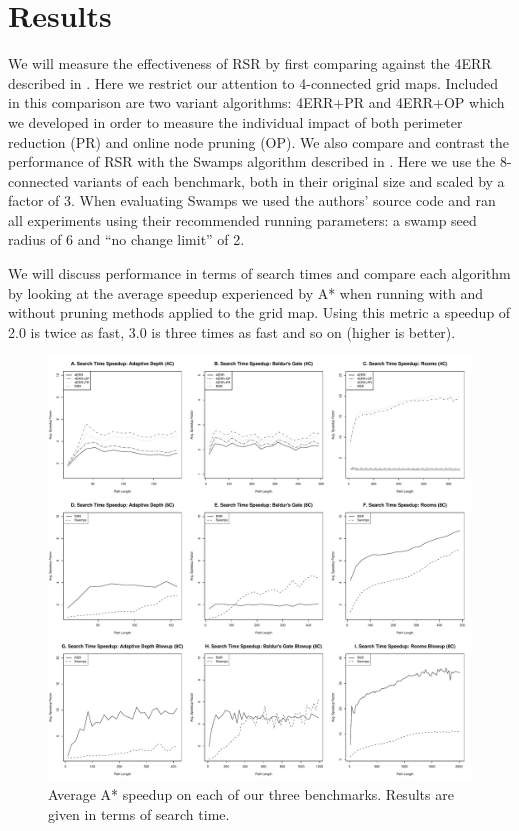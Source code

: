 \section{Results}
\label{sec-results}
We will measure the effectiveness of RSR by first comparing against the 4ERR
described in \cite{harabor10}. Here we restrict our attention to 4-connected
grid maps. Included in this comparison are two variant algorithms: 4ERR+PR and 
4ERR+OP which we developed in order to measure the individual impact of both
perimeter reduction (PR) and online node pruning (OP).
We also compare and contrast the performance of RSR
with the Swamps algorithm described in \cite{pochter10}.
Here we use the 8-connected variants of each benchmark, both in their original 
size and scaled by a factor of 3.
When evaluating Swamps we used the authors'
source code and ran all experiments using their recommended running parameters:
a swamp seed radius of 6 and ``no change limit'' of 2.  
\par 
We will discuss performance in terms of search times and compare each algorithm
by looking at the average speedup experienced by A* when running with and
without pruning methods applied to the grid map.  Using this metric a speedup of
2.0 is twice as fast, 3.0 is three times as fast and so on (higher is better).

\begin{figure}[t]
       \begin{center}
                       \includegraphics[width=1.95\columnwidth, trim = 10mm 10mm 10mm 0mm]{diagrams/speedup.pdf}
       \end{center}
       \caption{Average A* speedup on each of our three benchmarks. 
		Results are given in terms of search time.}
\label{fig-speedup}
\end{figure}

